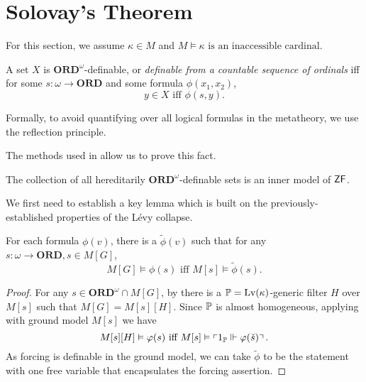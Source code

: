 \section{Solovay's Theorem}

For this section, we assume \(\kappa\in M\) and \(M\models \kappa \text{ is an inaccessible cardinal}\).

\begin{definition}
    A set \(X\) is \(\mathbf{ORD}^\omega\)-definable, or \emph{definable from a countable sequence of ordinals} iff
    for some \(s:\omega\to\mathbf{ORD}\) and some formula \(\phi(x_1,x_2)\),
    \[ y\in X \text{ iff } \phi(s,y). \]
\end{definition}
\begin{remark}
    Formally, to avoid quantifying over all logical formulas in the metatheory, we use the reflection principle.
\end{remark}

The methods used in \autocite{myhillscott1971} allow us to prove this fact.
\begin{proposition}
    The collection of all hereditarily \(\mathbf{ORD}^\omega\)-definable sets
    is an inner model of \(\ZF\).
\end{proposition}

We first need to establish a key lemma which is built on the previously-established properties of the Lévy collapse.
\begin{lemma} \label{lemma:solovay_key}
    For each formula \(\phi(v)\), there is a \(\tilde{\phi}(v)\) such that
    for any \(s:\omega\to\mathbf{ORD}, s\in M[G]\),
    \[ M[G]\models \phi(s) \text{ iff } M[s] \models \tilde{\phi}(s). \]
\end{lemma}
\begin{proof}
    For any \(s\in \mathbf{ORD}^\omega \cap M[G]\), by 
    there is a \(\P = \Lv(\kappa)\)-generic filter \(H\) over \(M[s]\) such that \(M[G] = M[s][H]\).
    Since \(\P\) is almost homogeneous, applying  with ground model \(M[s]\) we have
    \[ M[s][H]\models \phi(s) \text{ iff } M[s] \models \left\ulcorner 1_\P \forces \phi(\check{s}) \right\urcorner. \]
    As forcing is definable in the ground model,
    we can take \(\tilde{\phi}\) to be the statement with one free variable that encapsulates the forcing assertion.
\end{proof}

